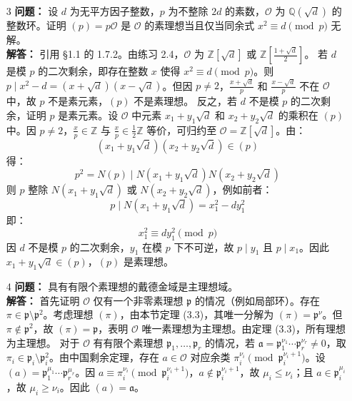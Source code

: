 \documentclass[UTF8]{ctexart}
\begin{document}
\begin{enumerate}
\begin{enumerate}
\item[3] 
\textbf{问题：} 设 \(d\) 为无平方因子整数，\(p\) 为不整除 \(2d\) 的素数，\(\mathcal{O}\) 为 \(\mathbb{Q}(\sqrt{d})\) 的整数环。证明 \((p) = p \mathcal{O}\) 是 \(\mathcal{O}\) 的素理想当且仅当同余式 \(x^2 \equiv d \pmod{p}\) 无解。\\
\textbf{解答：} 引用 §1.1 的 1.7.2。由练习 2.4，\(\mathcal{O}\) 为 \(\mathbb{Z}[\sqrt{d}]\) 或 \(\mathbb{Z}\left[\frac{1 + \sqrt{d}}{2}\right]\)。  
若 \(d\) 是模 \(p\) 的二次剩余，即存在整数 \(x\) 使得 \(x^2 \equiv d \pmod{p}\)。则 \(p \mid x^2 - d = (x + \sqrt{d})(x - \sqrt{d})\)。但因 \(p \neq 2\)，\(\frac{x + \sqrt{d}}{p}\) 和 \(\frac{x - \sqrt{d}}{p}\) 不在 \(\mathcal{O}\) 中，故 \(p\) 不是素元素，\((p)\) 不是素理想。  
反之，若 \(d\) 不是模 \(p\) 的二次剩余，证明 \(p\) 是素元素。设 \(\mathcal{O}\) 中元素 \(x_1 + y_1 \sqrt{d}\) 和 \(x_2 + y_2 \sqrt{d}\) 的乘积在 \((p)\) 中。因 \(p \neq 2\)，\(\frac{x}{p} \in \mathbb{Z}\) 与 \(\frac{x}{p} \in \frac{1}{2} \mathbb{Z}\) 等价，可归约至 \(\mathcal{O} = \mathbb{Z}[\sqrt{d}]\)。由：
\[
(x_1 + y_1 \sqrt{d})(x_2 + y_2 \sqrt{d}) \in (p)
\]
得：
\[
p^2 = N(p) \mid N(x_1 + y_1 \sqrt{d}) N(x_2 + y_2 \sqrt{d})
\]
则 \(p\) 整除 \(N(x_1 + y_1 \sqrt{d})\) 或 \(N(x_2 + y_2 \sqrt{d})\)，例如前者：
\[
p \mid N(x_1 + y_1 \sqrt{d}) = x_1^2 - d y_1^2
\]
即：
\[
x_1^2 \equiv d y_1^2 \pmod{p}
\]
因 \(d\) 不是模 \(p\) 的二次剩余，\(y_1\) 在模 \(p\) 下不可逆，故 \(p \mid y_1\) 且 \(p \mid x_1\)。因此 \(x_1 + y_1 \sqrt{d} \in (p)\)，\((p)\) 是素理想。

\item[4]
\textbf{问题：} 具有有限个素理想的戴德金域是主理想域。\\
\textbf{解答：} 首先证明 \(\mathcal{O}\) 仅有一个非零素理想 \(\mathfrak{p}\) 的情况（例如局部环）。存在 \(\pi \in \mathfrak{p} \setminus \mathfrak{p}^2\)。考虑理想 \((\pi)\)，由本节定理 (3.3)，其唯一分解为 \((\pi) = \mathfrak{p}^\nu\)。但 \(\pi \notin \mathfrak{p}^2\)，故 \((\pi) = \mathfrak{p}\)，表明 \(\mathcal{O}\) 唯一素理想为主理想。由定理 (3.3)，所有理想为主理想。  
对于 \(\mathcal{O}\) 有有限个素理想 \(\mathfrak{p}_1, \dots, \mathfrak{p}_r\) 的情况，若 \(\mathfrak{a} = \mathfrak{p}_1^{\nu_1} \cdots \mathfrak{p}_r^{\nu_r} \neq 0\)，取 \(\pi_i \in \mathfrak{p}_i \setminus \mathfrak{p}_i^2\)。由中国剩余定理，存在 \(a \in \mathcal{O}\) 对应余类 \(\pi_i^{\nu_i} \pmod{\mathfrak{p}_i^{\nu_i + 1}}\)。设 \((a) = \mathfrak{p}_1^{\mu_1} \cdots \mathfrak{p}_r^{\mu_r}\)。因 \(a \equiv \pi_i^{\nu_i} \pmod{\mathfrak{p}_i^{\nu_i + 1}}\)，\(a \notin \mathfrak{p}_i^{\nu_i + 1}\)，故 \(\mu_i \leq \nu_i\)；且 \(a \in \mathfrak{p}_i^{\mu_i}\)，故 \(\mu_i \geq \nu_i\)。因此 \((a) = \mathfrak{a}\)。


\end{enumerate}
\end{enumerate}
\end{document}
